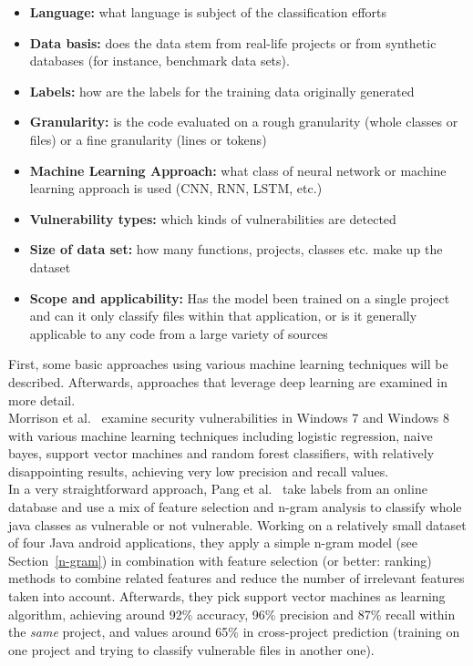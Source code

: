 \documentclass[
a4paper,
pagesize,
pdftex,
12pt,
twoside, %
BCOR=5mm, %
ngerman,
fleqn,
final,
]{scrartcl}
\begin{document}
	\begin{itemize}
		\item \textbf{Language:} what language is subject of the classification efforts
		\item \textbf{Data basis:} does the data stem from real-life projects or from synthetic databases (for instance, benchmark data sets).
		\item \textbf{Labels:} how are the labels for the training data originally generated
		\item \textbf{Granularity:} is the code evaluated on a rough granularity (whole classes or files) or a fine granularity (lines or tokens)
		\item \textbf{Machine Learning Approach:} what class of neural network or machine learning approach is used (CNN, RNN, LSTM, etc.)
		\item \textbf{Vulnerability types:} which kinds of vulnerabilities are detected
		\item \textbf{Size of data set:} how many functions, projects, classes etc. make up the dataset
		\item \textbf{Scope and applicability:} Has the model been trained on a single project and can it only classify files within that application, or is it generally applicable to any code from a large variety of sources
	\end{itemize}
	First, some basic approaches using various machine learning techniques will be described. Afterwards, approaches that leverage deep learning are examined in more detail.\\
	Morrison et al.~\cite{Morrison.2015} examine security vulnerabilities in Windows 7 and Windows 8 with various machine learning techniques including logistic regression, naive bayes, support vector machines and random forest classifiers, with relatively disappointing results, achieving very low precision and recall values.\\
	In a very straightforward approach, Pang et al.~\cite{Pang.2015} take labels from an online database and use a mix of feature selection and n-gram analysis to classify whole java classes as vulnerable or not vulnerable. Working on a relatively small dataset of four Java android applications, they apply a simple n-gram model (see Section~\ref{n-gram}) in combination with feature selection (or better: ranking) methods to combine related features and reduce the number of irrelevant features taken into account. Afterwards, they pick support vector machines as learning algorithm, achieving around 92\% accuracy, 96\% precision and 87\% recall within the \textit{same} project, and values around 65\% in cross-project prediction (training on one project and trying to classify vulnerable files in another one).\\
\end{document}
